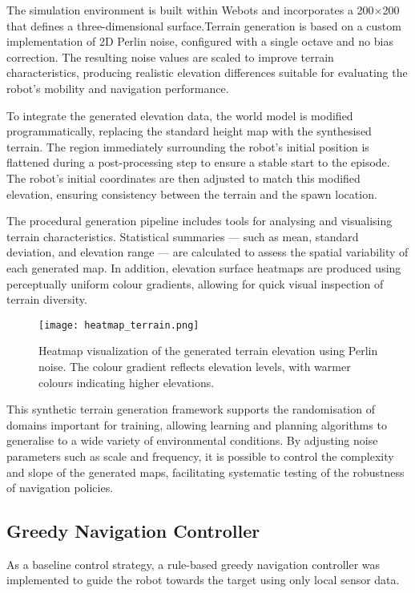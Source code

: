 \documentclass[11pt,twocolumn]{article}
\begin{document}
The simulation environment is built within Webots and incorporates a  200\(\times\)200 that defines a three-dimensional surface.Terrain generation is based on a custom implementation of 2D Perlin noise, configured with a single octave and no bias correction. The resulting noise values are scaled to improve terrain characteristics, producing realistic elevation differences suitable for evaluating the robot's mobility and navigation performance.

To integrate the generated elevation data, the world model is modified programmatically, replacing the standard height map with the synthesised terrain. The region immediately surrounding the robot's initial position is flattened during a post-processing step to ensure a stable start to the episode. The robot's initial coordinates are then adjusted to match this modified elevation, ensuring consistency between the terrain and the spawn location.

The procedural generation pipeline includes tools for analysing and visualising terrain characteristics. Statistical summaries — such as mean, standard deviation, and elevation range — are calculated to assess the spatial variability of each generated map. In addition, elevation surface heatmaps are produced using perceptually uniform colour gradients, allowing for quick visual inspection of terrain diversity.

\begin{figure}[htbp]
    \centering
    \texttt{[image: heatmap\_terrain.png]}
    \caption{Heatmap visualization of the generated terrain elevation using Perlin noise. The colour gradient reflects elevation levels, with warmer colours indicating higher elevations.}
    \label{fig:heatmap_terrain}
\end{figure}


This synthetic terrain generation framework supports the randomisation of domains important for training, allowing learning and planning algorithms to generalise to a wide variety of environmental conditions. By adjusting noise parameters such as scale and frequency, it is possible to control the complexity and slope of the generated maps, facilitating systematic testing of the robustness of navigation policies.

\subsection{Greedy Navigation Controller}

As a baseline control strategy, a rule-based greedy navigation controller was implemented to guide the robot towards the target using only local sensor data.
\end{document}

